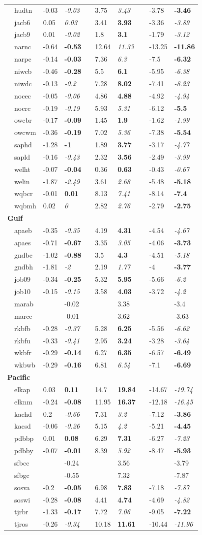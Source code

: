 \begin{table}[!tbp]
{\begin{center}
\begin{tabular}{lllcllcll}
~~hudtn&-0.03&{\it -0.03}&&3.75&{\it 3.43}&&-3.78&{\bf -3.46}\tabularnewline
~~jacb6&0.05&{\it 0.03}&&3.41&{\bf 3.93}&&-3.36&{\it -3.89}\tabularnewline
~~jacb9&0.01&{\it -0.02}&&1.8&{\bf 3.1}&&-1.79&{\it -3.12}\tabularnewline
~~narnc&-0.64&{\bf -0.53}&&12.64&{\it 11.33}&&-13.25&{\bf -11.86}\tabularnewline
~~narpc&-0.14&{\bf -0.03}&&7.36&{\it 6.3}&&-7.5&{\bf -6.32}\tabularnewline
~~niwcb&-0.46&{\bf -0.28}&&5.5&{\bf 6.1}&&-5.95&{\it -6.38}\tabularnewline
~~niwdc&-0.13&{\it -0.2}&&7.28&{\bf 8.02}&&-7.41&{\it -8.23}\tabularnewline
~~nocec&-0.05&{\it -0.06}&&4.86&{\bf 4.88}&&-4.92&{\it -4.94}\tabularnewline
~~nocrc&-0.19&{\it -0.19}&&5.93&{\it 5.31}&&-6.12&{\bf -5.5}\tabularnewline
~~owcbr&-0.17&{\bf -0.09}&&1.45&{\bf 1.9}&&-1.62&{\it -1.99}\tabularnewline
~~owcwm&-0.36&{\bf -0.19}&&7.02&{\it 5.36}&&-7.38&{\bf -5.54}\tabularnewline
~~saphd&-1.28&{\bf -1}&&1.89&{\bf 3.77}&&-3.17&{\it -4.77}\tabularnewline
~~sapld&-0.16&{\it -0.43}&&2.32&{\bf 3.56}&&-2.49&{\it -3.99}\tabularnewline
~~welht&-0.07&{\bf -0.04}&&0.36&{\bf 0.63}&&-0.43&{\it -0.67}\tabularnewline
~~welin&-1.87&{\it -2.49}&&3.61&{\it 2.68}&&-5.48&{\bf -5.18}\tabularnewline
~~wqbcr&-0.01&{\bf 0.01}&&8.13&{\it 7.41}&&-8.14&{\bf -7.4}\tabularnewline
~~wqbmh&0.02&{\it 0}&&2.82&{\it 2.76}&&-2.79&{\bf -2.75}\tabularnewline
\hline
{\bfseries Gulf}&&&&&&&&\tabularnewline
~~apaeb&-0.35&{\it -0.35}&&4.19&{\bf 4.31}&&-4.54&{\it -4.67}\tabularnewline
~~apaes&-0.71&{\bf -0.67}&&3.35&{\it 3.05}&&-4.06&{\bf -3.73}\tabularnewline
~~gndbc&-1.02&{\bf -0.88}&&3.5&{\bf 4.3}&&-4.51&{\it -5.18}\tabularnewline
~~gndbh&-1.81&{\it -2}&&2.19&{\it 1.77}&&-4&{\bf -3.77}\tabularnewline
~~job09&-0.34&{\bf -0.25}&&5.32&{\bf 5.95}&&-5.66&{\it -6.2}\tabularnewline
~~job10&-0.15&{\it -0.15}&&3.58&{\bf 4.03}&&-3.72&{\it -4.2}\tabularnewline
~~marab&&-0.02&&&3.38&&&-3.4\tabularnewline
~~marce&&-0.01&&&3.62&&&-3.63\tabularnewline
~~rkbfb&-0.28&{\it -0.37}&&5.28&{\bf 6.25}&&-5.56&{\it -6.62}\tabularnewline
~~rkbfu&-0.33&{\it -0.41}&&2.95&{\bf 3.24}&&-3.28&{\it -3.64}\tabularnewline
~~wkbfr&-0.29&{\bf -0.14}&&6.27&{\bf 6.35}&&-6.57&{\bf -6.49}\tabularnewline
~~wkbwb&-0.29&{\bf -0.16}&&6.81&{\it 6.54}&&-7.1&{\bf -6.69}\tabularnewline
\hline
{\bfseries Pacific}&&&&&&&&\tabularnewline
~~elkap&0.03&{\bf 0.11}&&14.7&{\bf 19.84}&&-14.67&{\it -19.74}\tabularnewline
~~elknm&-0.24&{\bf -0.08}&&11.95&{\bf 16.37}&&-12.18&{\it -16.45}\tabularnewline
~~kachd&0.2&{\it -0.66}&&7.31&{\it 3.2}&&-7.12&{\bf -3.86}\tabularnewline
~~kacsd&-0.06&{\it -0.26}&&5.15&{\it 4.2}&&-5.21&{\bf -4.45}\tabularnewline
~~pdbbp&0.01&{\bf 0.08}&&6.29&{\bf 7.31}&&-6.27&{\it -7.23}\tabularnewline
~~pdbby&-0.07&{\bf -0.01}&&8.39&{\it 5.92}&&-8.47&{\bf -5.93}\tabularnewline
~~sfbcc&&-0.24&&&3.56&&&-3.79\tabularnewline
~~sfbgc&&-0.55&&&7.32&&&-7.87\tabularnewline
~~sosva&-0.2&{\bf -0.05}&&6.98&{\bf 7.83}&&-7.18&{\it -7.87}\tabularnewline
~~soswi&-0.28&{\bf -0.08}&&4.41&{\bf 4.74}&&-4.69&{\it -4.82}\tabularnewline
~~tjrbr&-1.33&{\bf -0.17}&&7.72&{\it 7.06}&&-9.05&{\bf -7.22}\tabularnewline
~~tjros&-0.26&{\it -0.34}&&10.18&{\bf 11.61}&&-10.44&{\it -11.96}\tabularnewline
\hline
\end{tabular}\end{center}}


\end{table}
